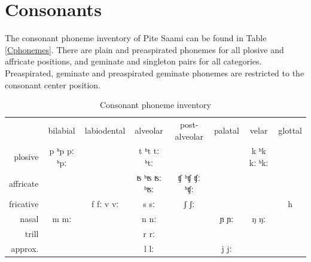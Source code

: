 \section{Consonants}\label{consonants}\label{CphoneInventory}
The consonant phoneme inventory of Pite Saami can be found in Table \vref{Cphonemes}.  
There are plain and preaspirated phonemes for all plosive and affricate positions, and geminate and singleton pairs for all categories. 
Preaspirated, geminate and preaspirated geminate phonemes are restricted to the consonant center position. 
\begin{table}\centering
\caption[Consonant phoneme inventory]{Consonant phoneme inventory}\label{Cphonemes}
\resizebox{1\linewidth}{!} {
\begin{tabular}{r c c c c c c c}
& bilabial & labiodental & alveolar & post-alveolar & palatal & velar & glottal\\\cline{2-8}
\multirow{1}{*}{plosive} & \multicolumn{1}{|c|}{p ʰp pː ʰpː} &\multicolumn{1}{c|}{}& \multicolumn{1}{c|}{t ʰt tː ʰtː}&\multicolumn{1}{c|}{}&\multicolumn{1}{c|}{}&\multicolumn{1}{c|}{k ʰk kː ʰkː}&\multicolumn{1}{c|}{}\\\cline{2-8}%
\multirow{1}{*}{affricate} &\multicolumn{1}{|c|}{}&\multicolumn{1}{c|}{}& \multicolumn{1}{c|}{ʦ ʰʦ ʦː ʰʦː} &\multicolumn{1}{c|}{ʧ ʰʧ ʧː ʰʧː}&\multicolumn{1}{c|}{}&\multicolumn{1}{c|}{}&\multicolumn{1}{c|}{}\\\cline{2-8}%
\multirow{1}{*}{fricative} &\multicolumn{1}{|c|}{}& \multicolumn{1}{c|}{f fː v vː} &\multicolumn{1}{c|}{s sː}&\multicolumn{1}{c|}{ʃ ʃː}&\multicolumn{1}{c|}{}&\multicolumn{1}{c|}{}&\multicolumn{1}{c|}{h}\\\cline{2-8}%
\multirow{1}{*}{nasal} &\multicolumn{1}{|c|}{m mː}&\multicolumn{1}{c|}{}&\multicolumn{1}{c|}{n nː} &\multicolumn{1}{c|}{}&\multicolumn{1}{c|}{ɲ ɲː} & \multicolumn{1}{|c|}{ŋ ŋː}&\multicolumn{1}{c|}{}\\\cline{2-8}%
\multirow{1}{*}{trill}&\multicolumn{1}{|c|}{}&\multicolumn{1}{c|}{}&\multicolumn{1}{c|}{r rː}&\multicolumn{1}{c|}{}&\multicolumn{1}{c|}{}&\multicolumn{1}{c|}{}&\multicolumn{1}{c|}{}\\\cline{2-8}%
\multirow{1}{*}{approx.}&\multicolumn{1}{|c|}{}&\multicolumn{1}{c|}{}&\multicolumn{1}{c|}{l lː}&\multicolumn{1}{c|}{}&\multicolumn{1}{c|}{j jː}&\multicolumn{1}{c|}{}&\multicolumn{1}{c|}{}\\\cline{2-8}%
\end{tabular}}
\end{table}

